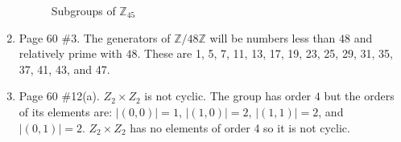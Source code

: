 \documentclass[12pt]{report}
\begin{document}
\begin{enumerate}
\begin{figure}[h]
\caption{Subgroups of $\mathbb{Z}_{45}$}
\end{figure}
\item Page 60 \#3. The generators of $\mathbb{Z}/48\mathbb{Z}$ will be numbers
      less than $48$ and relatively prime with $48$. These are 1, 5, 7, 11, 13,
      17, 19, 23, 25, 29, 31, 35, 37, 41, 43, and 47.

\item Page 60 \#12(a). $Z_2 \times Z_2$ is not cyclic. The group has order $4$
      but the orders of its elements are: $|(0,0)|=1$, $|(1,0)|=2$, $|(1,1)|=2$,
      and $|(0,1)|=2$. $Z_2 \times Z_2$ has no elements of order 4 so it is not
      cyclic.
\end{enumerate}
\end{document}
